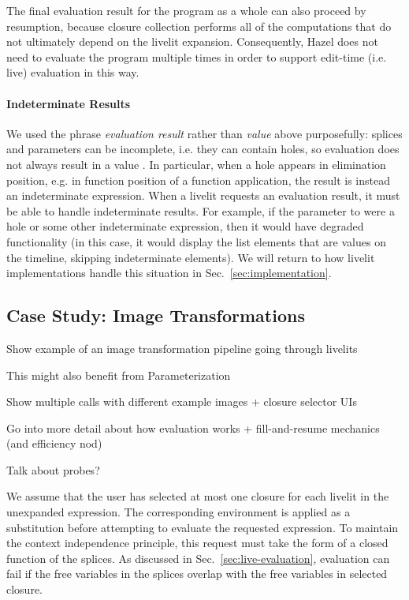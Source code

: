 The final evaluation result for the program as a whole can also proceed by resumption, because
closure collection performs all of the computations that do not ultimately depend on the livelit expansion.
Consequently, Hazel does not need to evaluate the program multiple times in order to support edit-time
(i.e. live) evaluation in this way.

\paragraph{Indeterminate Results}
We used the phrase \emph{evaluation result} rather than \emph{value} above purposefully:
splices and parameters can be incomplete, i.e. they can contain holes, so
evaluation does not always result in a value \cite{HazelnutLive}.
In particular, when a hole appears in elimination position, e.g. in function position of a function application,
 the result is instead an indeterminate expression.
When a livelit requests an evaluation result, it must be able to handle indeterminate results.
For example, if the parameter to  were a hole or some other indeterminate expression,
then it would have degraded functionality
(in this case, it would display the list elements that are values on the timeline, skipping indeterminate elements).
We will return to how livelit implementations handle this situation in Sec.~\ref{sec:implementation}.

\subsection{Case Study: Image Transformations}\label{sec:image-transformation}
Show example of an image transformation pipeline going through livelits

This might also benefit from Parameterization

Show multiple calls with different example images + closure selector UIs

Go into more detail about how evaluation works + fill-and-resume mechanics (and efficiency nod)

Talk about probes?

We assume that the user has selected at most one closure for each livelit in the unexpanded expression.
The corresponding environment is applied as a substitution before attempting to evaluate the requested expression.
To maintain the context independence principle, this request must take the form of a closed function
of the splices.
As discussed in Sec.~\ref{sec:live-evaluation}, evaluation can fail if the free variables in the splices
overlap with the free variables in selected closure.

